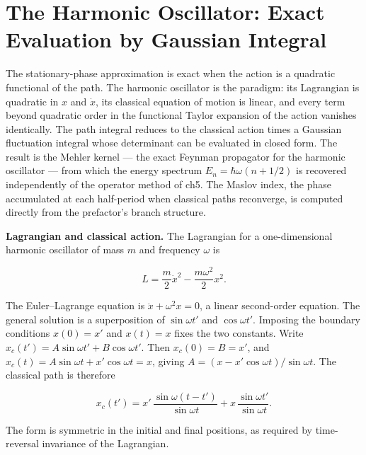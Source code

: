 \section{The Harmonic Oscillator: Exact Evaluation by Gaussian Integral}
\label{sec:harmonic-oscillator-path-integral}

The stationary-phase approximation is exact when the action is a quadratic functional of the path. The harmonic oscillator is the paradigm: its Lagrangian is quadratic in $x$ and $\dot{x}$, its classical equation of motion is linear, and every term beyond quadratic order in the functional Taylor expansion of the action vanishes identically. The path integral reduces to the classical action times a Gaussian fluctuation integral whose determinant can be evaluated in closed form. The result is the Mehler kernel --- the exact Feynman propagator for the harmonic oscillator --- from which the energy spectrum $E_n = \hbar\omega(n+1/2)$ is recovered independently of the operator method of ch5. The Maslov index, the phase accumulated at each half-period when classical paths reconverge, is computed directly from the prefactor's branch structure.

\medskip\noindent\textbf{Lagrangian and classical action.}
The Lagrangian for a one-dimensional harmonic oscillator of mass $m$ and frequency $\omega$ is
\begin{linenomath}
\begin{equation}
L = \frac{m}{2}\dot{x}^2 - \frac{m\omega^2}{2}x^2.
\end{equation}
\end{linenomath}
The Euler--Lagrange equation is $\ddot{x} + \omega^2 x = 0$, a linear second-order equation. The general solution is a superposition of $\sin\omega t'$ and $\cos\omega t'$. Imposing the boundary conditions $x(0) = x'$ and $x(t) = x$ fixes the two constants. Write $x_c(t') = A\sin\omega t' + B\cos\omega t'$. Then $x_c(0) = B = x'$, and $x_c(t) = A\sin\omega t + x'\cos\omega t = x$, giving $A = (x - x'\cos\omega t)/\sin\omega t$. The classical path is therefore
\begin{linenomath}
\begin{equation}
x_c(t') = x'\,\frac{\sin\omega(t-t')}{\sin\omega t} + x\,\frac{\sin\omega t'}{\sin\omega t}.
\label{eq:oscillator-classical-path}
\end{equation}
\end{linenomath}
The form is symmetric in the initial and final positions, as required by time-reversal invariance of the Lagrangian.

